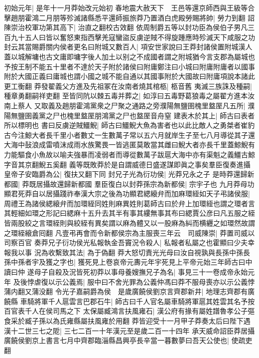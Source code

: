 初始元年|{
	是年十一月莽始改元始初}
春地震大赦天下　王邑等還京師西與王級等合擊趙朋霍鴻二月朋等殄滅諸縣悉平還師振旅莽乃置酒白虎殿勞賜將帥|{
	勞力到翻}
詔陳崇治校軍功第其高下|{
	治直之翻校古效翻}
依周制爵五等以封功臣為侯伯子男凡三百九十五人曰皆以奮怒東指西擊羌寇蠻盜反虜逆賊不得旋踵應時殄滅天下咸服之功封云其當賜爵關内侯者更名曰附城又數百人|{
	項安世家說曰王莽封諸侯置附城漢人蓋以城解墉也古文庸即墉字後人加土以别之不成國者謂之附城猶今言支郡為屬城也予按王制不能五十里者不達於天子附於諸侯曰附庸鄭注曰小城曰附庸附庸者以國事附於大國正義曰庸城也謂小國之城不能自通以其國事附於大國故曰附庸項說本諸此更工衡翻}
莽發翟義父方進及先祖冢在汝南者燒其棺柩|{
	柩音舊}
夷滅三族誅及種嗣|{
	種章勇翻嗣祥吏翻}
至皆同阬以棘五毒并葬之|{
	如淳曰五毒野葛狼毒之屬翟方進本汝南上蔡人}
又取義及趙朋霍鴻黨衆之尸聚之通路之旁濮陽無鹽圉槐里盩厔凡五所|{
	濮陽無鹽圉義黨之尸也槐里盩厔朋鴻黨之尸也盩厔音舟窒}
建表木於其上|{
	師古曰表者所以標明也}
書曰反虜逆賊䲔鯢|{
	師古曰䲔鯢大魚為害者也以此比敵人之勇桀者崔豹古今注鯨大者長千里小者數丈一生數萬子常以五六月就岸生子至七八月導從其子還大海中鼔浪成雷噴沫成雨水族驚畏一皆逃匿莫敢當其雌曰鯢大者亦長千里蓋鯨鯢有力能驅食小魚故以喻夫強暴而凌弱者而導從數萬子跋扈大海中亦有渠魁之義䲔古鯨字音其京翻鯢五奚翻}
義等既敗莽於是自謂威德日盛遂謀即眞之事矣羣臣復奏進攝皇帝子安臨爵為公|{
	復扶又翻下同}
封兄子光為衍功侯|{
	光莽兄永之子}
是時莽還歸新都國|{
	莽既居攝故還歸新都國}
羣臣復白以封莽孫宗為新都侯|{
	宗宇子也}
九月莽母功顯君死莽自以居攝踐祚奉漢大宗之後為功顯君緦縗弁而加麻環絰如天子弔諸侯服|{
	周禮王為諸侯緦縗弁而加環絰同姓則麻異姓則葛師古曰於弁上加環絰也謂之環者言其輕細如環之形記曰緦麻十五升去其半有事其縷無事其布曰緦賈公彦曰凡五服之絰皆兩股絞之言環絰則與絞絰有異矣謂以麻為體又以一股麻為糾而横纒之如環然故謂之環絰縗倉囘翻}
凡壹弔再會而令新都侯宗為主服喪三年云　司威陳崇|{
	莽置司威以司察百官}
奏莽兄子衍功侯光私報執金吾竇況令殺人|{
	私報者私屬之也霍顯曰少夫幸報我以事}
況為收繫致其法|{
	為于偽翻}
莽大怒切責光光母曰汝自視孰與長孫中孫長孫中孫者宇及獲之字也|{
	獲死見上卷哀帝元夀元年宇死見上平帝元始三年師古曰中讀曰仲}
遂母子自殺及況皆死初莽以事母養嫂撫兄子為名|{
	事見三十一卷成帝永始元年}
及後悖虐復以示公義焉|{
	服中曰不舍光罪為公義仲馮曰莽不服母喪亦以示公義悖蒲内翻又蒲没翻}
令光子嘉嗣爵為侯　是歲廣饒侯劉京言齊郡新井|{
	地理志齊郡有廣饒縣}
車騎將軍千人扈雲言巴郡石牛|{
	師古曰千人官名屬車騎將軍扈其姓雲其名予按百官表千人在侯司馬之下}
太保屬臧鴻言扶風雍石|{
	漢公府有掾有屬姓譜魯孝公子彄食采於臧子孫以為氏雍縣屬扶風雍於用翻}
莽皆迎受十一月甲子莽奏太后曰陛下遇漢十二世三七之阸|{
	三七二百一十年漢元至是歲二百一十四年}
承天威命詔臣莽居攝廣饒侯劉京上書言七月中齊郡臨淄縣昌興亭長辛當一暮數夢曰吾天公使也|{
	使疏吏翻}
